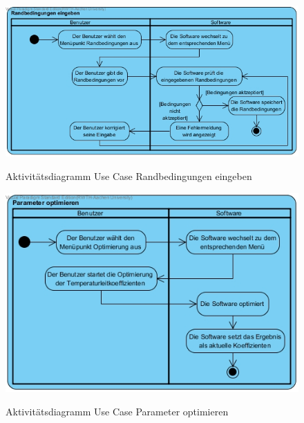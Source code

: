 \begin{figure}[H]
	\centering
	\includegraphics[scale=.5]{Bilder/Randbedingungen_eingeben.jpg}\\
	\caption{Aktivitätsdiagramm Use Case Randbedingungen eingeben}
	\label{Aktivitätsdiagramm Use Case Randbedingungen eingeben}
\end{figure}

\begin{figure}[H]
	\centering
	\includegraphics[scale=.5]{Bilder/Parameter_optimieren.jpg}\\
	\caption{Aktivitätsdiagramm Use Case Parameter optimieren}
	\label{Aktivitätsdiagramm Use Case Parameter optimieren}
\end{figure}

